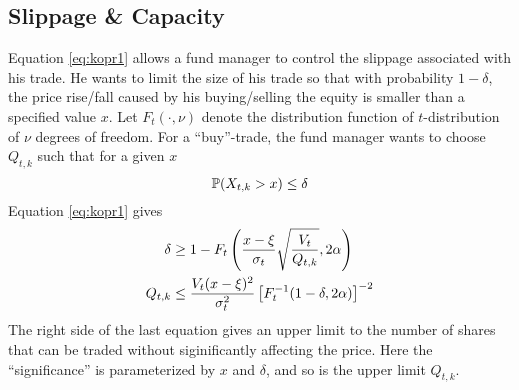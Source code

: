 \subsection{Slippage \& Capacity}
Equation \eqref{eq:kopr1} allows a fund manager to control the
slippage associated with his trade. He wants to limit the size of his
trade so that with probability $1 - \delta$, the price rise/fall
caused by his buying/selling the equity is smaller than a specified
value $x$. Let $F_t(\cdot, \nu)$ denote the distribution function of
$t$-distribution of $\nu$ degrees of freedom. For a ``buy''-trade, the
fund manager wants to choose $Q_{t,k}$ such that for a given $x$
\[
  \P(X_{t,k} > x) \leq \delta
\]
Equation \eqref{eq:kopr1} gives
\begin{align*}
  \delta &\geq
           1 - F_t\left(
           {x - \xi \over \sigma_t} \sqrt{V_t \over Q_{t,k}}, 2\alpha
           \right) \\
  Q_{t, k} &\leq
             {V_t  (x - \xi)^2 \over \sigma_t^2}
             \left[
             F_t^{-1}(1 - \delta, 2\alpha)
             \right]^{-2}
\end{align*}
The right side of the last equation gives an upper limit to the number
of shares that can be traded without siginificantly affecting the price.
Here the ``significance'' is parameterized by $x$ and $\delta$, and so is
the upper limit $Q_{t,k}$.






